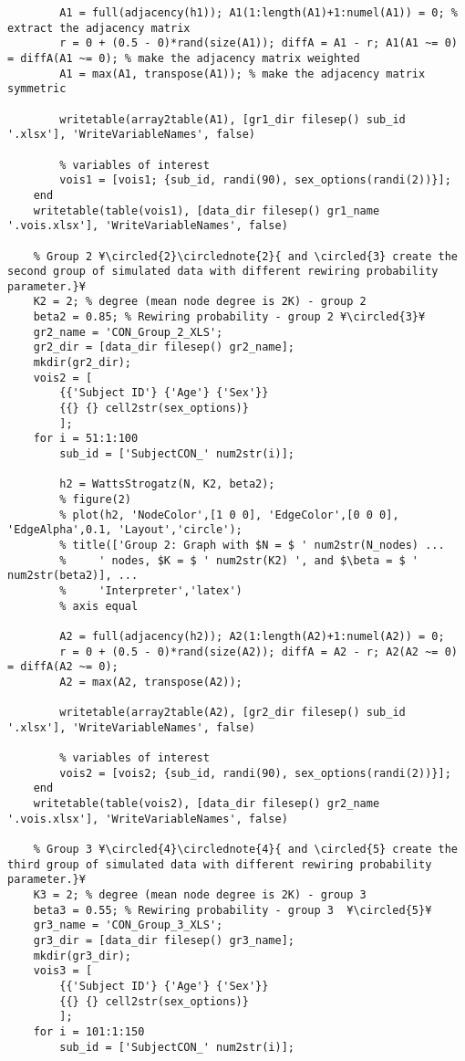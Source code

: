 \documentclass{tufte-handout}
\begin{document}
\begin{lstlisting}
        A1 = full(adjacency(h1)); A1(1:length(A1)+1:numel(A1)) = 0; % extract the adjacency matrix
        r = 0 + (0.5 - 0)*rand(size(A1)); diffA = A1 - r; A1(A1 ~= 0) = diffA(A1 ~= 0); % make the adjacency matrix weighted
        A1 = max(A1, transpose(A1)); % make the adjacency matrix symmetric

        writetable(array2table(A1), [gr1_dir filesep() sub_id '.xlsx'], 'WriteVariableNames', false)

        % variables of interest
        vois1 = [vois1; {sub_id, randi(90), sex_options(randi(2))}];
    end
    writetable(table(vois1), [data_dir filesep() gr1_name '.vois.xlsx'], 'WriteVariableNames', false)

    % Group 2 ¥\circled{2}\circlednote{2}{ and \circled{3} create the second group of simulated data with different rewiring probability parameter.}¥
    K2 = 2; % degree (mean node degree is 2K) - group 2
    beta2 = 0.85; % Rewiring probability - group 2 ¥\circled{3}¥
    gr2_name = 'CON_Group_2_XLS';
    gr2_dir = [data_dir filesep() gr2_name];
    mkdir(gr2_dir);
    vois2 = [
        {{'Subject ID'} {'Age'} {'Sex'}}
        {{} {} cell2str(sex_options)}
        ];
    for i = 51:1:100
        sub_id = ['SubjectCON_' num2str(i)];

        h2 = WattsStrogatz(N, K2, beta2);
        % figure(2)
        % plot(h2, 'NodeColor',[1 0 0], 'EdgeColor',[0 0 0], 'EdgeAlpha',0.1, 'Layout','circle');
        % title(['Group 2: Graph with $N = $ ' num2str(N_nodes) ...
        %     ' nodes, $K = $ ' num2str(K2) ', and $\beta = $ ' num2str(beta2)], ...
        %     'Interpreter','latex')
        % axis equal

        A2 = full(adjacency(h2)); A2(1:length(A2)+1:numel(A2)) = 0;
        r = 0 + (0.5 - 0)*rand(size(A2)); diffA = A2 - r; A2(A2 ~= 0) = diffA(A2 ~= 0);
        A2 = max(A2, transpose(A2));

        writetable(array2table(A2), [gr2_dir filesep() sub_id '.xlsx'], 'WriteVariableNames', false)

        % variables of interest
        vois2 = [vois2; {sub_id, randi(90), sex_options(randi(2))}];
    end
    writetable(table(vois2), [data_dir filesep() gr2_name '.vois.xlsx'], 'WriteVariableNames', false)

    % Group 3 ¥\circled{4}\circlednote{4}{ and \circled{5} create the third group of simulated data with different rewiring probability parameter.}¥
    K3 = 2; % degree (mean node degree is 2K) - group 3
    beta3 = 0.55; % Rewiring probability - group 3  ¥\circled{5}¥
    gr3_name = 'CON_Group_3_XLS';
    gr3_dir = [data_dir filesep() gr3_name];
    mkdir(gr3_dir);
    vois3 = [
        {{'Subject ID'} {'Age'} {'Sex'}}
        {{} {} cell2str(sex_options)}
        ];
    for i = 101:1:150
        sub_id = ['SubjectCON_' num2str(i)];


\end{lstlisting}
\end{document}
